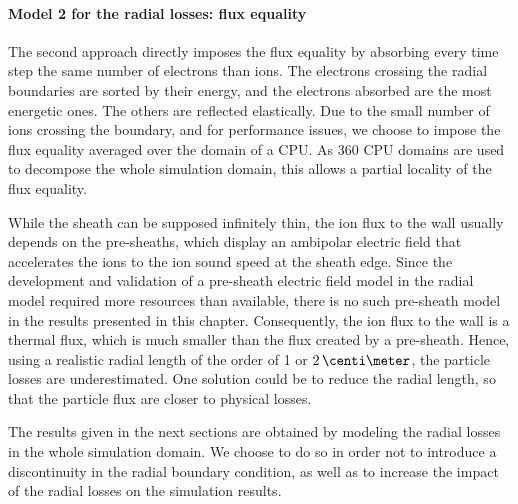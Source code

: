 \paragraph{Model 2 for the  radial losses\string: flux equality\\}
The second approach directly imposes the flux equality by absorbing every time step the same number of electrons than ions.
The electrons crossing the radial boundaries are sorted by their energy, and the electrons absorbed are the most energetic ones.
The others are reflected elastically.
Due to the small number of ions crossing the boundary, and for performance issues, we choose to impose the flux equality averaged over the domain of a CPU.
As 360 CPU domains are used to decompose the whole simulation domain, this allows a partial locality of the flux equality. 

\vspace{1ex}
While the sheath can be supposed infinitely thin, the ion flux to the wall usually depends on the pre-sheaths, which display an ambipolar electric field that accelerates the ions to the ion sound speed at the sheath edge.
Since the development and validation of a pre-sheath electric field model in the radial model required more resources than available, there is no such pre-sheath model in the results presented in this chapter.
Consequently, the ion flux to the wall is a thermal flux, which is much smaller than the flux created by a pre-sheath.
Hence, using a realistic radial length  of the order of 1 or $2\,\centi\meter$, the particle losses are underestimated.
One solution could be to reduce the radial length, so that the particle flux are closer to physical losses.

The results given in the next sections are obtained by modeling the radial losses in the whole simulation domain.
We choose to do so in order not to introduce a discontinuity in the radial boundary condition, as well as to increase the impact of the radial losses on the simulation results.
